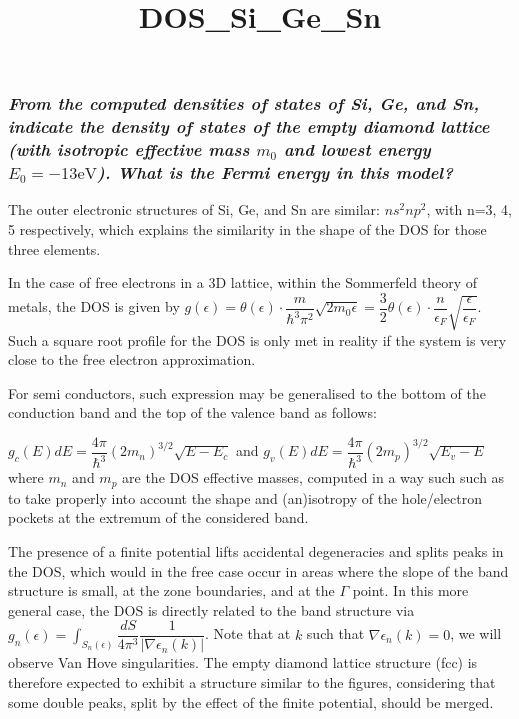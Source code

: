 \documentclass{article}
\title{DOS\_Si\_Ge\_Sn}
\begin{document}
    
    
    \maketitle
    
    

    

    \subsubsection{\emph{From the computed densities of states of Si, Ge, and Sn, indicate
the density of states of the empty diamond lattice (with isotropic
effective mass $m_0$ and lowest energy $E_0 = -13\text{eV}$). What is
the Fermi energy in this model? }}


    The outer electronic structures of Si, Ge, and Sn are similar:
$ns^2np^2$, with n=3, 4, 5 respectively, which explains the similarity
in the shape of the DOS for those three elements.

In the case of free electrons in a 3D lattice, within the Sommerfeld
theory of metals, the DOS is given by
$g(\epsilon)=\theta(\epsilon) \cdot \dfrac{m}{\hbar^3 \pi^2}\sqrt{2m_0\epsilon}=\dfrac{3}{2} \theta(\epsilon) \cdot \dfrac{n}{\epsilon_F}\sqrt{\dfrac{\epsilon}{\epsilon_F}}$.
Such a square root profile for the DOS is only met in reality if the
system is very close to the free electron approximation.

For semi conductors, such expression may be generalised to the bottom of
the conduction band and the top of the valence band as follows:

$g_c(E)dE = \dfrac{4\pi}{\hbar^3}(2m_n)^{3/2}\sqrt{E-E_c}$ and
$g_v(E)dE = \dfrac{4\pi}{\hbar^3}(2m_p)^{3/2}\sqrt{E_v-E}$ where $m_n$
and $m_p$ are the DOS effective masses, computed in a way such such as
to take properly into account the shape and (an)isotropy of the
hole/electron pockets at the extremum of the considered band.

The presence of a finite potential lifts accidental degeneracies and
splits peaks in the DOS, which would in the free case occur in areas
where the slope of the band structure is small, at the zone boundaries,
and at the $\Gamma$ point. In this more general case, the DOS is
directly related to the band structure via
$g_n(\epsilon) = \int_{S_n(\epsilon)} \dfrac{dS}{4\pi^3}\dfrac{1}{|\nabla \epsilon_n(k)|}$.
Note that at $k$ such that $\nabla \epsilon_n(k)=0$, we will observe Van
Hove singularities. The empty diamond lattice structure (fcc) is
therefore expected to exhibit a structure similar to the figures,
considering that some double peaks, split by the effect of the finite
potential, should be merged.
\end{document}
